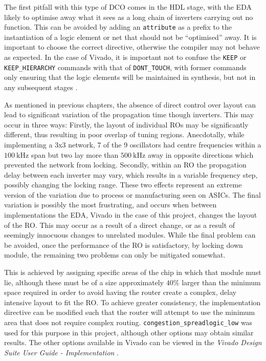 The first pitfall with this type of \ac{DCO} comes in the \ac{HDL} stage, with the \ac{EDA} likely to optimise away what it sees as a long chain of inverters carrying out no function. This can be avoided by adding an \texttt{attribute} as a prefix to the instantiation of a logic element or net that should not be ``optimised'' away. It is important to choose the correct directive, otherwise the compiler may not behave as expected. In the case of Vivado, it is important not to confuse the \texttt{KEEP} or \texttt{KEEP\_HIERARCHY} commands with that of \texttt{DONT\_TOUCH}, with former commands only ensuring that the logic elements will be maintained in synthesis, but not in any subsequent stages \cite{synth_ug}.

As mentioned in previous chapters, the absence of direct control over layout can lead to significant variation of the propagation time though inverters. This may occur in three ways: Firstly, the layout of individual \ac{RO}s may be significantly different, thus resulting in poor overlap of tuning regions. Anecdotally, while implementing a 3x3 network, 7 of the 9 oscillators had centre frequencies within a $100~\si{\kilo\hertz}$ span but two lay more than $500~\si{\kilo\hertz}$ away in opposite directions which prevented the network from locking. Secondly, within an \ac{RO} the propagation delay between each inverter may vary, which results in a variable frequency step, possibly changing the locking range. These two effects represent an extreme version of the variation due to process or manufacturing seen on \ac{ASIC}s. The final variation is possibly the most frustrating, and occurs when between implementations the \ac{EDA}, Vivado in the case of this project, changes the layout of the \ac{RO}. This may occur as a result of a direct change, or as a result of seemingly innocuous changes to unrelated modules. While the final problem can be avoided, once the performance of the \ac{RO} is satisfactory, by locking down module, the remaining two problems can only be mitigated somewhat.

This is achieved by assigning specific areas of the chip in which that module must lie, although these must be of a size approximately $40\%$ larger than the minimum space required in order to avoid having the router create a complex, delay intensive layout to fit the \ac{RO}. To achieve greater consistency, the implementation directive can be modified such that the router will attempt to use the minimum area that does not require complex routing. \texttt{congestion_spreadlogic_low} was used for this purpose in this project, although other options may obtain similar results. The other options available in Vivado can be viewed in the \textit{Vivado Design Suite User Guide - Implementation} \cite{impl_ug}.

